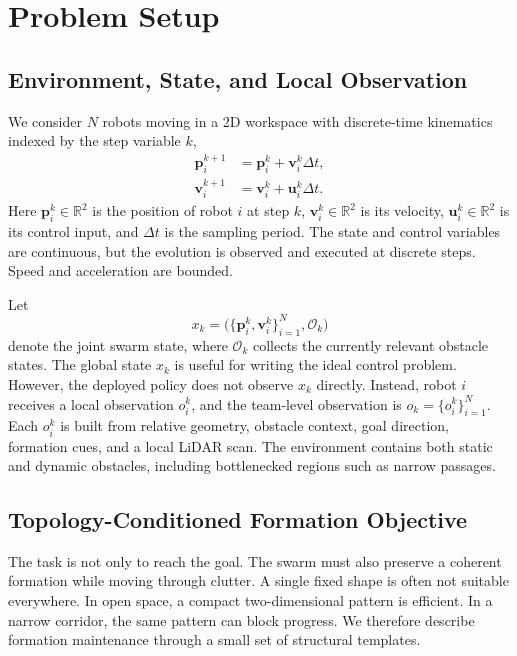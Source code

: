 \documentclass{ieeeaccess}
\newcommand{\R}{\mathbb{R}}
\newcommand{\bfu}{\mathbf{u}}
\newcommand{\bfp}{\mathbf{p}}
\newcommand{\bfv}{\mathbf{v}}
\begin{document}
\section{Problem Setup}
\label{sec:problem}

\subsection{Environment, State, and Local Observation}
We consider $N$ robots moving in a 2D workspace with discrete-time
kinematics indexed by the step variable $k$,
\begin{equation}
\begin{aligned}
\bfp_i^{k+1} &= \bfp_i^k + \bfv_i^k\Delta t,\\
\bfv_i^{k+1} &= \bfv_i^k + \bfu_i^k\Delta t.
\end{aligned}
\label{eq:dynamics}
\end{equation}
Here $\bfp_i^k\in\R^2$ is the position of robot $i$ at step $k$,
$\bfv_i^k\in\R^2$ is its velocity, $\bfu_i^k\in\R^2$ is its control
input, and $\Delta t$ is the sampling period. The state and control
variables are continuous, but the evolution is observed and executed at
discrete steps. Speed and acceleration are bounded.

Let
\[
x_k=\bigl(\{\bfp_i^k,\bfv_i^k\}_{i=1}^N,\mathcal{O}_k\bigr)
\]
denote the joint swarm state, where $\mathcal{O}_k$ collects the
currently relevant obstacle states. The global state $x_k$ is useful
for writing the ideal control problem. However, the deployed policy does
not observe $x_k$ directly. Instead, robot $i$ receives a local
observation $o_i^k$, and the team-level observation is
$o_k=\{o_i^k\}_{i=1}^N$. Each $o_i^k$ is built from relative geometry,
obstacle context, goal direction, formation cues, and a local LiDAR
scan. The environment contains both static and dynamic obstacles,
including bottlenecked regions such as narrow passages.

\subsection{Topology-Conditioned Formation Objective}
The task is not only to reach the goal. The swarm must also preserve a
coherent formation while moving through clutter. A single fixed shape is
often not suitable everywhere. In open space, a compact two-dimensional
pattern is efficient. In a narrow corridor, the same pattern can block
progress. We therefore describe formation maintenance through a small
set of structural templates.
\end{document}
